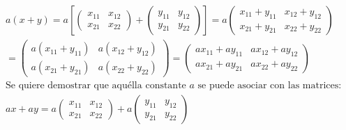 \begin{exercise}[ Sea $a\in \R$, $x=\begin{pmatrix}
				x_{11}&x_{12}\\x_{21}&x_{22}\end{pmatrix}$ y $y=\begin{pmatrix}
				y_{11}&y_{12}\\y_{21}&y_{22}\end{pmatrix}$, $x,y\in M_{2\times 2}(\R)$]

	\begin{align*}
		 & a(x+y)=a\left[\begin{pmatrix}
				                 x_{11}&x_{12}\\x_{21}&x_{22}\end{pmatrix}+\begin{pmatrix}
				                                                           y_{11}&y_{12}\\y_{21}&y_{22}\end{pmatrix} \right]=a\begin{pmatrix}
			                                                                                                              x_{11}+y_{11}&x_{12}+y_{12}\\x_{21}+y_{21}&x_{22}+y_{22}\end{pmatrix} \\
		 & =\begin{pmatrix}
			    a(x_{11}+y_{11})&a(x_{12}+y_{12})\\a(x_{21}+y_{21})&a(x_{22}+y_{22})\end{pmatrix}=\begin{pmatrix}
			                                                                                      ax_{11}+ay_{11}&ax_{12}+ay_{12}\\ax_{21}+ay_{21}&ax_{22}+ay_{22}\end{pmatrix}                 \\
		 & \text{Se quiere demostrar que aquélla constante $a$ se puede asociar con las matrices:}                                                                                          \\
		 & ax+ay=a\begin{pmatrix}
			          x_{11}&x_{12}\\x_{21}&x_{22}\end{pmatrix}+a\begin{pmatrix}
			                                                     y_{11}&y_{12}\\y_{21}&y_{22}\end{pmatrix}                                                                                      \\

\end{align*}
\end{exercise}
